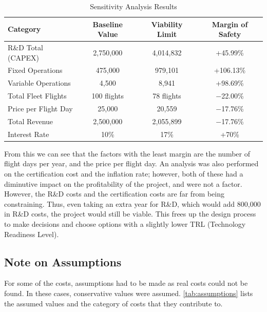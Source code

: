 \begin{table}[H]
    \centering
    \caption{Sensitivity Analysis Results}
    \label{tab:sensitivity}
    \renewcommand{\arraystretch}{1.15}
    \begin{tabular}{|l|c|c|c|}
        \hline
        \textbf{Category} & \textbf{Baseline Value} & \textbf{Viability Limit} & \textbf{Margin of Safety} \\
        \hline \hline
        R\&D Total (CAPEX)   & \texteuro{}2,750,000 & \texteuro{}4,014,832 & +45.99\% \\
        \hline
        Fixed Operations     & \texteuro{}475,000   & \texteuro{}979,101   & +106.13\% \\
        \hline
        Variable Operations  & \texteuro{}4,500     & \texteuro{}8,941     & +98.69\% \\
        \hline
        Total Fleet Flights  & 100 flights          & 78 flights           & $-$22.00\% \\
        \hline
        Price per Flight Day & \texteuro{}25,000    & \texteuro{}20,559    & $-$17.76\% \\
        \hline
        Total Revenue        & \texteuro{}2,500,000 & \texteuro{}2,055,899 & $-$17.76\% \\
        \hline
        Interest Rate        & 10\%                 & 17\%                 & +70\% \\
        \hline
    \end{tabular}
\end{table}

From this we can see that the factors with the least margin are the number of flight days per year, and the price per flight day. An analysis was also performed on the certification cost and the inflation rate; however, both of these had a diminutive impact on the profitability of the project, and were not a factor. However, the R\&D costs and the certification costs are far from being constraining. Thus, even taking an extra year for R\&D, which would add \texteuro{}800,000 in R\&D costs, the project would still be viable. This frees up the design process to make decisions and choose options with a slightly lower TRL (Technology Readiness Level).

\subsection{Note on Assumptions}

For some of the costs, assumptions had to be made as real costs could not be found. In these cases, conservative values were assumed. \autoref{tab:assumptions} lists the assumed values and the category of costs that they contribute to.

